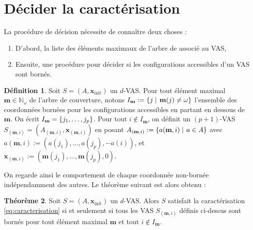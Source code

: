 \documentclass[a4paper,final]{article}
\theoremstyle{definition}
\newtheorem{Theorem}{Théorème}
\newtheorem{Definition}[Theorem]{Définition}
\newcommand{\set}[2]{\left\{#1\mathrel{\left|\vphantom{#1}\vphantom{#2}\right.}#2\right\}}
\newcommand{\os}[1]{\left\{\mathinner{#1}\right\}}
\newcommand{\N}{\ensuremath{\mathbb{N}}}
\newcommand{\Nomega}{\ensuremath{\mathbb{N}_\omega}}
\newcommand{\lang}{\ensuremath{\mathcal{L}}}
\newcommand{\vect}[1]{\ensuremath{\mathbf{#1}}}
\newcommand{\xinit}{\ensuremath{\vect{x}_\text{init}}}
\newcommand{\valeur}[1]{\ensuremath{\overline{#1}}}
\begin{document}


\section{Décider la caractérisation}

La procédure de décision nécessite de connaître deux choses :
\begin{enumerate}
    \item D'abord, la liste des éléments maximaux de l'arbre de  associé au VAS,
    \item Ensuite, une procédure pour décider si les configurations accessibles d'un VAS sont bornés.
\end{enumerate}

\begin{Definition}
Soit $S=(A,\xinit)$ un $d$-VAS.
Pour tout élément maximal $\vect{m}\in\Nomega$ de l'arbre de couverture, notons $I_\vect{m}:=\set{j}{\vect{m}(j)\neq \omega}$ l'ensemble des coordonnées bornées pour les configurations accessibles en partant en dessous de $\vect{m}$.
On écrit $I_\vect{m}=\os{j_1,\dots,j_p}$.
Pour tout $i\notin I_\vect{m}$, on définit un $(p+1)$-VAS $S_{(\vect{m},i)} =(A_{(\vect{m},i)}, \vect{x}_{(\vect{m},i)})$ en posant
$A_{(\vect{m},i)} :=\set{a(\vect{m},i)}{a\in A}$ avec $\valeur{a(\vect{m},i)} :=(a(j_1),\dots,a(j_p),-a(i))$, 
et $\vect{x}_{(\vect{m},i)} :=(\vect{m}(j_1),\dots,\vect{m}(j_p),0)$.
\end{Definition}

On regarde ainsi le comportement de chaque coordonnée non-bornée indépendamment des autres.
Le théorème suivant est alors obtenu :

\begin{Theorem}
    Soit $S=(A,\xinit)$ un $d$-VAS.
    Alors $S$ satisfait la caractérisation \eqref{eq:caracterisation} si et seulement si tous les VAS $S_{(\vect{m},i)}$ définis ci-dessus sont bornés pour tout élément maximal $\vect{m}$ et tout $i\notin I_\vect{m}$.
\end{Theorem}

\end{document}
